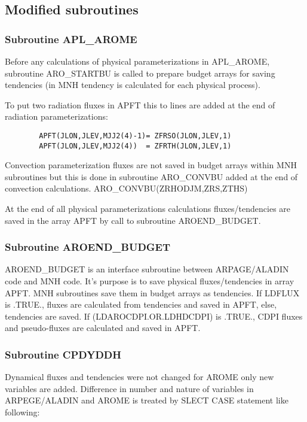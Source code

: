 \subsection{Modified subroutines}

 \subsubsection{Subroutine APL\_AROME}

%
Before any calculations of physical parameterizations in APL\_AROME, subroutine ARO\_STARTBU is called to prepare budget arrays for saving tendencies (in MNH tendency is calculated for each physical process).

To put two radiation fluxes in APFT this to lines are added at the end of radiation parameterizations: %
    \begin{verbatim}
        APFT(JLON,JLEV,MJJ2(4)-1)= ZFRSO(JLON,JLEV,1)
        APFT(JLON,JLEV,MJJ2(4))  = ZFRTH(JLON,JLEV,1) 
    \end{verbatim}

Convection parameterization fluxes are not saved in budget arrays within MNH subroutines but this is done in subroutine ARO_CONVBU added at the end of convection calculations.
        ARO\_CONVBU(ZRHODJM,ZRS,ZTHS)

At the end of all physical parameterizations calculations fluxes/tendencies are saved in the array APFT by call to subroutine AROEND\_BUDGET.

  \subsubsection{Subroutine AROEND\_BUDGET}
AROEND\_BUDGET is an interface subroutine between ARPAGE/ALADIN code and MNH code. It's purpose is to save physical fluxes/tendencies in array APFT. MNH subroutines save them in budget arrays as tendencies. If LDFLUX is .TRUE., fluxes are calculated from tendencies and saved in APFT, else, tendencies are saved. If (LDAROCDPI.OR.LDHDCDPI) is .TRUE., CDPI fluxes and pseudo-fluxes are calculated and saved in APFT.

  \subsubsection{Subroutine CPDYDDH}
Dynamical fluxes and tendencies were not changed for AROME only new variables are added. Difference in number and nature of variables in ARPEGE/ALADIN and AROME is treated by SLECT CASE statement like following:

